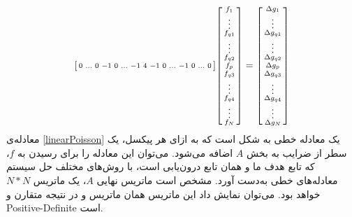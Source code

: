 \begin{equation} \label{linearPoisson}
	\begin{bsmallmatrix}0 & \ldots & 0 & -1 & 0 &  \ldots & -1 & 4 & -1 & 0 & \ldots & -1 & 0 & \ldots& 0\end{bsmallmatrix} 
	\begin{bsmallmatrix}f_1 \\ \vdots \\ f_{q1} \\ \vdots\\ f_{q2} \\ f_p \\ f_{q3} \\ \vdots \\ f_{q4} \\ \vdots \\ f_N \end{bsmallmatrix} = 
	\begin{bsmallmatrix}\Delta g_1 \\ \vdots \\ \Delta g_{q1} \\ \vdots\\ \Delta g_{q2} \\ \Delta g_p \\ \Delta g_{q3} \\ \vdots \\ \Delta g_{q4} \\ \vdots \\ \Delta g_N\end{bsmallmatrix}
\end{equation}
معادله‌ی \ref{linearPoisson} یک معادله خطی به شکل  است که به ازای هر پیکسل، یک سطر از ضرایب به بخش $A$ اضافه می‌شود. می‌توان این معادله را برای رسیدن به $f$، که تابع هدف ما و همان تابع درون‌یابی است، با روش‌های مختلف حل سیستم معادله‌های خطی به‌دست آورد. مشخص است ماتریس نهایی $A$، یک ماتریس $N*N$ خواهد بود. می‌توان نمایش داد این ماتریس همان ماتریس 
و در نتیجه متقارن و \gls{Positive-Definite} است.

